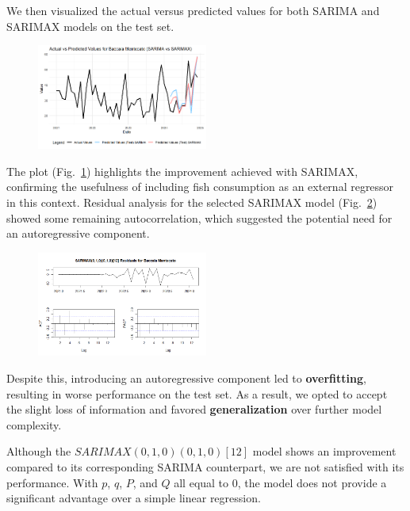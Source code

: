 \documentclass[10pt,twocolumn,letterpaper]{article}
\begin{document}
We then visualized the actual versus predicted values for both SARIMA and SARIMAX models on the test set.
\begin{figure}[h!]
    \centering
    \includegraphics[width=0.5\textwidth]{PlotsBEFD/M_COMPARE_SARIMAX_SARIMA_TEST_PRED.png} 
    \caption{}
    \label{fig:M_COMPARE_SARIMAX_SARIMA_TEST_PRED}
\end{figure}
The plot (Fig.~\ref{fig:M_COMPARE_SARIMAX_SARIMA_TEST_PRED}) highlights the improvement achieved with SARIMAX, confirming the usefulness of including fish consumption as an external regressor in this context.
Residual analysis for the selected SARIMAX model (Fig.~\ref{fig:ACF_SARIMAX_M}) showed some remaining autocorrelation, which suggested the potential need for an autoregressive component. 
\begin{figure}[h!]
    \centering
    \includegraphics[width=0.5\textwidth]{PlotsBEFD/ACF_SARIMAX_M.png} 
    \caption{}
    \label{fig:ACF_SARIMAX_M}
\end{figure}

Despite this, introducing an autoregressive component led to \textbf{overfitting}, resulting in worse performance on the test set. As a result, we opted to accept the slight loss of information and favored \textbf{generalization} over further model complexity.

Although the $SARIMAX(0,1,0)(0,1,0)[12]$ model shows an improvement compared to its corresponding SARIMA counterpart, we are not satisfied with its performance. With $p$, $q$, $P$, and $Q$ all equal to $0$, the model does not provide a significant advantage over a simple linear regression.
\end{document}
